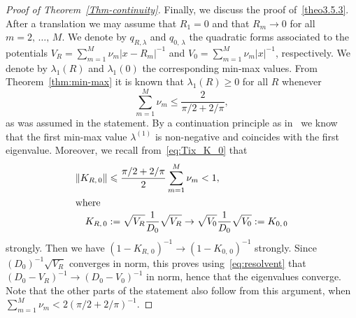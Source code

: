 \documentclass[AHL,Unicode,published]{cedram}
\newcommand\1{{\ensuremath {\mathds 1} }}
\renewcommand{\geq}{\geqslant}
\renewcommand{\leq}{\leqslant}
\begin{document}
\begin{proof}[Proof of Theorem~\ref{Thm-continuity}]
Finally, we discuss the proof of~\eqref{theo3.5.3}. After a translation we may assume that $R_1=0$ and that $R_m\to0$ for all $m=2,\,\dots,\,M$. We denote by $q_{R,\lambda}$ and $q_{0,\,\lambda}$ the quadratic forms associated to the potentials $V_R=\sum_{m=1}^M\nu_m|x-R_m|^{-1}$ and $V_0=\sum_{m=1}^M\nu_m|x|^{-1}$, respectively. We denote by $\lambda_1(R)$ and $\lambda_1(0)$ the corresponding min-max values. From Theorem~\ref{thm:min-max} it is known that $\lambda_1(R)\geq0$ for all $R$ whenever
\[
\sum_{m=1}^M\nu_m\leq\frac2{\pi/2+2/\pi},
\]
as was assumed in the statement. By a continuation principle as in~\cite{DolEstSer-00} we know that the first min-max value $\lambda^{(1)}$ is non-negative and coincides with the first eigenvalue. Moreover, we recall from~\eqref{eq:Tix_K_0} that
\begin{align*}
\left\|K_{R,\,0}\right\|&\leq \frac{\pi/2+2/\pi}2\sum_{m=1}^M\nu_m<1,
\\
\intertext{where}
K_{R,\,0}&:=\sqrt{V_R}\frac{1}{D_0}\sqrt{V_R}\to \sqrt{V_0}\frac1{D_0}\sqrt{V_0}:=K_{0,\,0}
\end{align*}
strongly. Then we have $(1-K_{R,\,0})^{-1}\to (1-K_{0,\,0})^{-1}$ strongly. Since $(D_0)^{-1}\sqrt{V_R}$ converges in norm, this proves using~\eqref{eq:resolvent} that $(D_0-V_R)^{-1}\to (D_0-V_0)^{-1}$ in norm, hence that the eigenvalues converge. Note that the other parts of the statement also follow from this argument, when $\sum_{m=1}^M\nu_m< 2(\pi/2+2/\pi)^{-1}$.
\end{proof}

\vspace{12pt}




\vspace{12pt}
\end{document}
